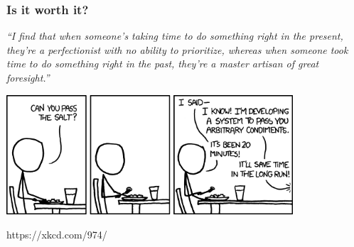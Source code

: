 \documentclass[12pt]{beamer}
\begin{document}
\begin{frame}
  \frametitle{Is it worth it?}
  \begin{center}
    \textit{``I find that when someone's taking time to do something
      right in the present, they're a perfectionist with no ability to
      prioritize, whereas when someone took time to do something right
      in the past, they're a master artisan of great foresight.''}
    
    \vspace{5mm}
    \includegraphics[width=0.8\textwidth]{the_general_problem.png}
    
    {\tiny https://xkcd.com/974/}
  \end{center}
\end{frame}
\end{document}
